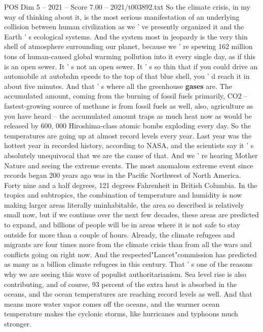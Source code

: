 \begin{textsample}{POS Dim 5 – 2021 – Score 7.00 – 2021/t003892.txt}  \label{ex:f5_pos_075}
So the climate crisis, in my way of thinking about it, is the most serious manifestation of an underlying collision between human civilization as we ' ve presently organized it and the Earth ' s ecological systems.
And the system most in jeopardy is the very thin shell of atmosphere surrounding our planet, because we ' re spewing 162 million tons of human-caused global warming pollution into it every single day, as if this is an open sewer.
It ' s not an open sewer.
It ' s so thin that if you could drive an automobile at autobahn speeds to the top of that blue shell, you ' d reach it in about five minutes.
And that ' s where all the greenhouse \textbf{gases} are.
The accumulated amount, coming from the burning of fossil fuels primarily, CO2 -- fastest-growing source of methane is from fossil fuels as well, also, agriculture as you have heard -- the accumulated amount traps as much heat now as would be released by 600, 000 Hiroshima-class atomic bombs exploding every day.
So the temperatures are going up at almost record levels every year.
Last year was the hottest year in recorded history, according to NASA, and the scientists say it ' s absolutely unequivocal that we are the cause of that.
And we ' re hearing Mother Nature and seeing the extreme events.
The most anomalous extreme event since records began 200 years ago was in the Pacific Northwest of North America.
Forty nine and a half degrees, 121 degrees Fahrenheit in British Columbia.
In the tropics and subtropics, the combination of temperature and humidity is now making larger areas literally uninhabitable, the area so described is relatively small now, but if we continue over the next few decades, these areas are predicted to expand, and billions of people will be in areas where it is not safe to stay outside for more than a couple of hours.
Already, the climate refugees and migrants are four times more from the climate crisis than from all the wars and conflicts going on right now.
And the respected"Lancet"commission has predicted as many as a billion climate refugees in this century.
That ' s one of the reasons why we are seeing this wave of populist authoritarianism.
Sea level rise is also contributing, and of course, 93 percent of the extra heat is absorbed in the oceans, and the ocean temperatures are reaching record levels as well.
And that means more water vapor comes off the oceans, and the warmer ocean temperature makes the cyclonic storms, like hurricanes and typhoons much stronger.

\end{textsample}
